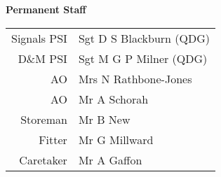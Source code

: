 \begin{center}
  \Large
  \textbf{Permanent Staff}
\end{center}

\begin{center}
  \begin{tabular}{rl}
    Signals PSI & Sgt D S Blackburn (QDG) \\
    D\&M PSI & Sgt M G P Milner (QDG) \\
    AO & Mrs N Rathbone-Jones \\
    AO & Mr A Schorah \\
    Storeman & Mr B New \\
    Fitter & Mr G Millward \\
    Caretaker & Mr A Gaffon \\
  \end{tabular}
\end{center}
